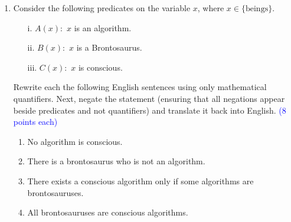 \documentclass{article}
\newcommand{\pte}[1]{\textcolor{blue}{(#1 points each)}}
\begin{document}
\begin{enumerate}
    \item Consider the following predicates on the variable $x$, where $x \in \{\text{beings}\}.$
    \begin{enumerate}
        \item[i.] $A(x):$ $x$ is an algorithm.
        \item[ii.] $B(x):$ $x$ is a Brontosaurus.
        \item[iii.] $C(x):$ $x$ is conscious.
    \end{enumerate}
    Rewrite each the following English sentences using only mathematical quantifiers. Next, negate the statement (ensuring that all negations appear beside predicates and not quantifiers) and translate it back into English. \pte 8
    
    \begin{enumerate}
        \item No algorithm is conscious.
        
        \item There is a brontosaurus who is not an algorithm.
        
        \item There exists a conscious algorithm only if some algorithms are brontosauruses.
        
        \item All brontosauruses are conscious algorithms.
    \end{enumerate}
    

\end{enumerate}
\end{document}
